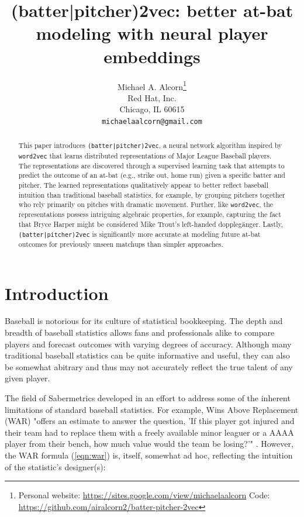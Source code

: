 \documentclass{article}
\title{(batter|pitcher)2vec: better at-bat modeling with neural player embeddings}
\date{}
\author{
    Michael A. Alcorn\thanks
    {Personal website: \url{https://sites.google.com/view/michaelaalcorn}\newline
    \hspace*{1.8em}Code: \url{https://github.com/airalcorn2/batter-pitcher-2vec}} \\
    Red Hat, Inc.\\
    Chicago, IL 60615 \\
    \texttt{michaelaalcorn@gmail.com} \\
}
\begin{document}
\maketitle

\begin{abstract}

This paper introduces \texttt{(batter|pitcher)2vec}, a neural network algorithm inspired by \texttt{word2vec} that learns distributed representations of Major League Baseball players. The representations are discovered through a supervised learning task that attempts to predict the outcome of an at-bat (e.g., strike out, home run) given a specific batter and pitcher. The learned representations qualitatively appear to better reflect baseball intuition than traditional baseball statistics, for example, by grouping pitchers together who rely primarily on pitches with dramatic movement. Further, like \texttt{word2vec}, the representations possess intriguing algebraic properties, for example, capturing the fact that Bryce Harper might be considered Mike Trout's left-handed dopplegänger. Lastly, \texttt{(batter|pitcher)2vec} is significantly more accurate at modeling future at-bat outcomes for previously unseen matchups than simpler approaches.

\end{abstract}

\section{Introduction}

Baseball is notorious for its culture of statistical bookkeeping. The depth and breadth of baseball statistics allows fans and professionals alike to compare players and forecast outcomes with varying degrees of accuracy. Although many traditional baseball statistics can be quite informative and useful, they can also be somewhat abitrary and thus may not accurately reflect the true talent of any given player.

The field of Sabermetrics developed in an effort to address some of the inherent limitations of standard baseball statistics. For example, Wins Above Replacement (WAR) "offers an estimate to answer the question, 'If this player got injured and their team had to replace them with a freely available minor leaguer or a AAAA player from their bench, how much value would the team be losing?'" \parencite{WAR}. However, the WAR formula (\ref{eqn:war}) is, itself, somewhat ad hoc, reflecting the intuition of the statistic's designer(s):
\end{document}
